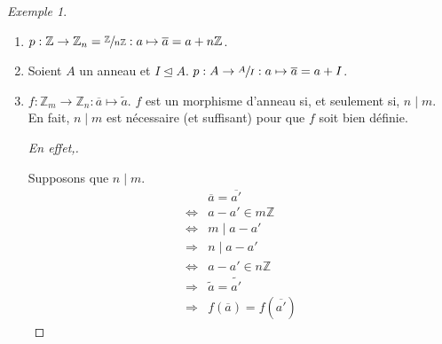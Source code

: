 \documentclass{report}
\theoremstyle{definition}
\theoremstyle{remark}
\newtheorem*{exem}{Exemple}
\def\ZZ{\mathbb{Z}}
\begin{document}
	\begin{exem}
		\begin{enumerate}
			\item $p : \ZZ\to\ZZ_n=\sfrac{\ZZ}{n\ZZ} : a\mapsto\overline{a}=a+n\ZZ$.
			\item Soient $A$ un anneau et $I\trianglelefteq A$. $p : A\to\sfrac{A}{I} : a\mapsto\overline{a}=a+I$.
			\item $f : \ZZ_m\to\ZZ_n : \overline{a}\mapsto\widetilde{a}$. $f$ est un morphisme d'anneau si, et seulement si, $n \mid m$. En fait, $n \mid m$ est n\'ecessaire (et suffisant) pour que $f$ soit bien d\'efinie.
			\begin{proof}[En effet,]~

				Supposons que $n \mid m$.
				\begin{align*}
					&\overline{a} = \overline{a'}\\
					\Longleftrightarrow& a-a'\in m\ZZ\\
					\Longleftrightarrow& m \mid a-a'\\
					\Longrightarrow& n \mid a-a'\\
					\Longleftrightarrow& a-a'\in n\ZZ\\
					\Longrightarrow& \widetilde{a}=\widetilde{a'}\\
					\Longrightarrow& f(\overline{a})=f(\overline{a'})
				\end{align*}


\end{proof}
\end{enumerate}
\end{exem}
\end{document}
